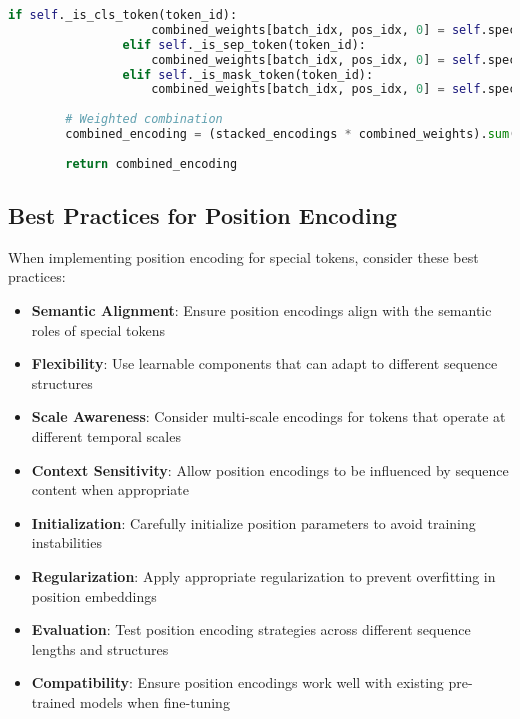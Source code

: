 \begin{lstlisting}[language=Python, caption=Multi-scale position encoding for hierarchical processing]
                if self._is_cls_token(token_id):
                    combined_weights[batch_idx, pos_idx, 0] = self.special_scale_preferences['cls_scales']
                elif self._is_sep_token(token_id):
                    combined_weights[batch_idx, pos_idx, 0] = self.special_scale_preferences['sep_scales']
                elif self._is_mask_token(token_id):
                    combined_weights[batch_idx, pos_idx, 0] = self.special_scale_preferences['mask_scales']
                    
        # Weighted combination
        combined_encoding = (stacked_encodings * combined_weights).sum(dim=-1)
        
        return combined_encoding
\end{lstlisting}

\subsection{Best Practices for Position Encoding}

When implementing position encoding for special tokens, consider these best practices:

\begin{itemize}
\item \textbf{Semantic Alignment}: Ensure position encodings align with the semantic roles of special tokens
\item \textbf{Flexibility}: Use learnable components that can adapt to different sequence structures
\item \textbf{Scale Awareness}: Consider multi-scale encodings for tokens that operate at different temporal scales
\item \textbf{Context Sensitivity}: Allow position encodings to be influenced by sequence content when appropriate
\item \textbf{Initialization}: Carefully initialize position parameters to avoid training instabilities
\item \textbf{Regularization}: Apply appropriate regularization to prevent overfitting in position embeddings
\item \textbf{Evaluation}: Test position encoding strategies across different sequence lengths and structures
\item \textbf{Compatibility}: Ensure position encodings work well with existing pre-trained models when fine-tuning
\end{itemize}